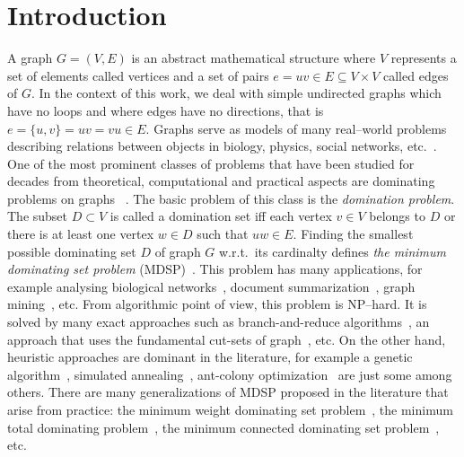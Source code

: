 \documentclass[dvipsnames,format=sigconf,anonymous=true,review=true]{acmart}
\begin{document}
\section{Introduction}
A graph $G=(V,E)$ is an abstract mathematical structure 
where $V$ represents a set of elements called vertices and   a set of pairs $e = uv  \in E \subseteq V \times V$ called edges of $G$. In the context of this work, we deal with  simple undirected graphs which have no loops and where edges have no directions, that is $e = \{u,v\}  = uv = vu \in E$.   Graphs serve as models of many real--world problems describing relations between objects in biology, physics, social networks,  etc.~\cite{mashaghi2004investigation,pirzada2007applications,shah2019characterizing,doi:10.1137/S0895480100375831}. One of the most prominent classes of problems that have been studied for decades from theoretical, computational and practical aspects are dominating problems on graphs~ \cite{haynes2013fundamentals}. The basic problem of this class is the \textit{domination problem}. The subset $D \subset V$ is called a domination set iff each vertex $v\in V$ belongs to $D$ or there is at least one vertex $w\in D$ such that $uw\in E$. Finding the smallest possible dominating set $D$ of graph $G$ w.r.t.\ its cardinalty defines \emph{the minimum dominating set problem} (MDSP)~\cite{grandoni2006note}. This problem has many applications, for example analysing biological networks~\cite{nacher2016minimum}, document summarization~\cite{shen2010multi}, graph mining~\cite{chalupa2018order},  etc. From algorithmic point of view, this problem is NP--hard. It is solved by many exact approaches such as branch-and-reduce algorithms~\cite{van2011exact}, an approach that uses the fundamental cut-sets of graph~\cite{karci2020new}, etc. On the other hand, heuristic approaches are dominant in the literature, for example a genetic algorithm~\cite{hedar2010hybrid}, simulated annealing~\cite{hedar2012simulated}, ant-colony optimization~\cite{ho2006enhanced} are just some among others. There are many generalizations of MDSP proposed in the literature that arise from practice: the minimum weight dominating set problem~\cite{romania2010ant}, the minimum total dominating problem~\cite{yuan2019novel}, the minimum connected dominating set problem~\cite{butenko2004new}, etc.
\end{document}
